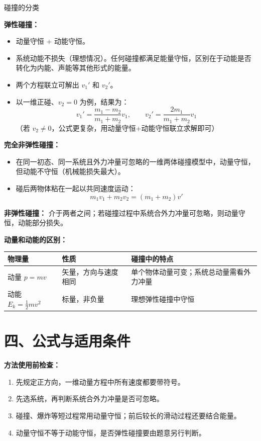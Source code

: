 \begin{conceptbox}{碰撞的分类}

\textbf{弹性碰撞：}
\begin{itemize}
  \item 动量守恒 + 动能守恒。
  \item 系统动能不损失（理想情况）。任何碰撞都满足能量守恒，区别在于动能是否转化为内能、声能等其他形式的能量。
  \item 两个方程联立可解出 $v_1'$ 和 $v_2'$。
  \item 以一维正碰、$v_2=0$ 为例，结果为：
  \[
  v_1' = \frac{m_1 - m_2}{m_1 + m_2} v_1,\qquad
  v_2' = \frac{2m_1}{m_1 + m_2} v_1
  \]
  （若 $v_2\neq 0$，公式更复杂，用动量守恒+动能守恒联立求解即可）
\end{itemize}

\textbf{完全非弹性碰撞：}
\begin{itemize}
  \item 在同一初态、同一系统且外力冲量可忽略的一维两体碰撞模型中，动量守恒，但动能不守恒（机械能损失最大）。
  \item 碰后两物体粘在一起以共同速度运动：
  \[
  m_1 v_1 + m_2 v_2 = (m_1 + m_2) v'
  \]
\end{itemize}

\textbf{非弹性碰撞：} 介于两者之间；若碰撞过程中系统合外力冲量可忽略，则动量守恒，动能部分损失。

\textbf{动量和动能的区别：}
\begin{center}
\begin{tabular}{@{}p{}p{}p{}@{}}
\toprule
物理量 & 性质 & 碰撞中的特点 \\
\midrule
动量 $p=mv$ & 矢量，方向与速度相同 & 单个物体动量可变；系统总动量需看外力冲量 \\
动能 $E_k=\frac12 mv^2$ & 标量，非负量 & 理想弹性碰撞中守恒 \\
\bottomrule
\end{tabular}
\end{center}

\end{conceptbox}

\section*{四、公式与适用条件}

\textbf{方法使用前检查：}
\begin{enumerate}
  \item 先规定正方向，一维动量方程中所有速度都要带符号。
  \item 先选系统，再判断系统合外力冲量是否可忽略。
  \item 碰撞、爆炸等短过程常用动量守恒；前后较长的滑动过程还要结合能量。
  \item 动量守恒不等于动能守恒，是否弹性碰撞要由题意另行判断。
\end{enumerate}

